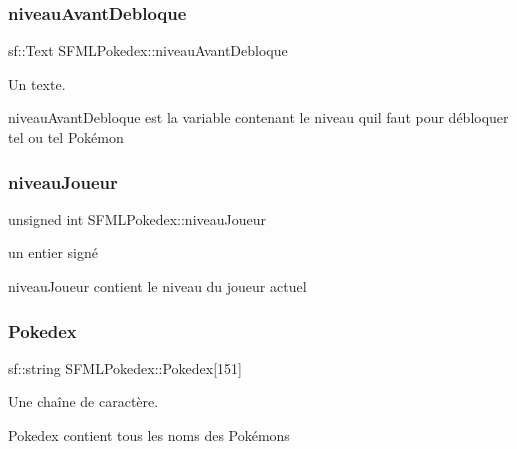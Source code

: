 \subsubsection{\texorpdfstring{niveau\+Avant\+Debloque}{niveauAvantDebloque}}
{\footnotesize\ttfamily sf\+::\+Text S\+F\+M\+L\+Pokedex\+::niveau\+Avant\+Debloque\hspace{0.3cm}{\ttfamily [private]}}



Un texte. 

niveau\+Avant\+Debloque est la variable contenant le niveau qu\textquotesingle{}il faut pour débloquer tel ou tel Pokémon \mbox{\label{class_s_f_m_l_pokedex_ae112351a9ce9d53bc25d4ffcb3f13d1c}} 
\subsubsection{\texorpdfstring{niveau\+Joueur}{niveauJoueur}}
{\footnotesize\ttfamily unsigned int S\+F\+M\+L\+Pokedex\+::niveau\+Joueur\hspace{0.3cm}{\ttfamily [private]}}



un entier signé 

niveau\+Joueur contient le niveau du joueur actuel \mbox{\label{class_s_f_m_l_pokedex_ad0c89f220e7cf46a05aa2ea8d68843d8}} 
\subsubsection{\texorpdfstring{Pokedex}{Pokedex}}
{\footnotesize\ttfamily sf\+::string S\+F\+M\+L\+Pokedex\+::\+Pokedex\mbox{[}151\mbox{]}\hspace{0.3cm}{\ttfamily [private]}}



Une chaîne de caractère. 

Pokedex contient tous les noms des Pokémons \mbox{\label{class_s_f_m_l_pokedex_a51173885dca46730a4ed3ecd51ea7c07}} 
